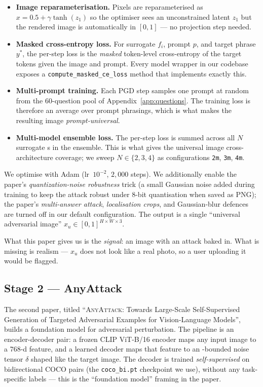 \begin{itemize}
  \item \textbf{Image reparameterisation.} Pixels are reparameterised as $x = 0.5 + \gamma \tanh(z_1)$ so the optimiser sees an unconstrained latent $z_1$ but the rendered image is automatically in $[0,1]$ --- no projection step needed.
  \item \textbf{Masked cross-entropy loss.} For surrogate \vlm{} $f_i$, prompt $p$, and target phrase $y^\ast$, the per-step loss is the \emph{masked} token-level cross-entropy of the target tokens given the image and prompt. Every model wrapper in our codebase exposes a \texttt{compute\_masked\_ce\_loss} method that implements exactly this.
  \item \textbf{Multi-prompt training.} Each PGD step samples one prompt at random from the 60-question pool of Appendix~\ref{app:questions}. The training loss is therefore an average over prompt phrasings, which is what makes the resulting image \emph{prompt-universal}.
  \item \textbf{Multi-model ensemble loss.} The per-step loss is summed across all $N$ surrogate \vlm{}s in the ensemble. This is what gives the universal image cross-architecture coverage; we sweep $N \in \{2, 3, 4\}$ as configurations \texttt{2m}, \texttt{3m}, \texttt{4m}.
\end{itemize}

We optimise with Adam (lr~$10^{-2}$, $2{,}000$ steps). We additionally enable the paper's \emph{quantization-noise robustness} trick (a small Gaussian noise added during training to keep the attack robust under 8-bit quantisation when saved as PNG); the paper's \emph{multi-answer attack}, \emph{localisation crops}, and Gaussian-blur defences are turned off in our default configuration. The output is a single ``universal adversarial image'' $x_u \in [0,1]^{H \times W \times 3}$.

What this paper gives us is the \emph{signal}: an image with an attack baked in. What is missing is realism --- $x_u$ does not look like a real photo, so a user uploading it would be flagged.

\subsection{Stage 2 --- AnyAttack \citep{zhang2025anyattack}}
\label{sec:method-stage2}

The second paper, titled ``\textsc{AnyAttack}: Towards Large-Scale Self-Supervised Generation of Targeted Adversarial Examples for Vision-Language Models'', builds a foundation model for adversarial perturbation. The pipeline is an encoder-decoder pair: a frozen CLIP ViT-B/16 encoder \citep{radford2021clip} maps any input image to a $768$-d feature, and a learned decoder maps that feature to an \Linf{}-bounded noise tensor $\delta$ shaped like the target image. The decoder is trained \emph{self-supervised} on bidirectional COCO pairs (the \texttt{coco\_bi.pt} checkpoint we use), without any task-specific labels --- this is the ``foundation model'' framing in the paper.

